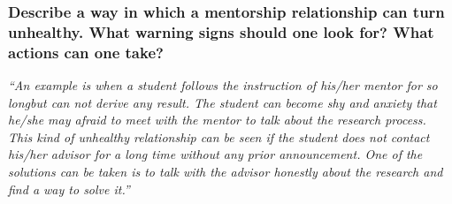 \documentclass[12pt]{beamer}
\newcommand\ans[1]{{\it ``#1''}}
\begin{document}
\begin{frame} %
  \frametitle{ Describe a way in which a mentorship relationship can turn unhealthy. What warning signs should one look for? What actions can one take?
  }
  

\ans{An  example  is  when  a  student  follows  the  instruction  of  his/her  mentor  for  so  longbut can not derive any result.  The student can become shy and anxiety that he/she may afraid to meet with the mentor to talk about the research process.  This kind of unhealthy relationship can be seen if the student does not contact his/her advisor for a long time without any prior announcement.  One of the solutions can be taken is to talk with the advisor honestly about the research and find a way to solve it.}

\end{frame}
\end{document}
